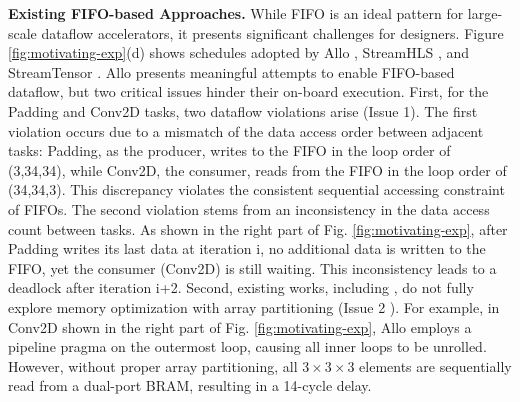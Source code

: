 \documentclass[conference]{IEEEtran}
\begin{document}
\textbf{Existing FIFO-based Approaches.} While FIFO is an ideal pattern for large-scale dataflow accelerators, it presents significant challenges for designers. Figure \ref{fig:motivating-exp}(d) shows schedules adopted by Allo \cite{chen2024allo}, StreamHLS \cite{streamhlsFPGA25}, and StreamTensor \cite{streamtensorMICRO25}.
Allo \cite{chen2024allo} presents meaningful attempts to enable FIFO-based dataflow, but two critical issues hinder their on-board execution. First, for the Padding and Conv2D tasks, two  dataflow violations arise (Issue 1). The first violation occurs due to a mismatch of the data access order between adjacent tasks: Padding, as the producer, writes to the FIFO in the loop order of (3,34,34), while Conv2D, the consumer, reads from the FIFO in the loop order of (34,34,3). This discrepancy violates the consistent sequential accessing constraint of FIFOs. The second violation stems from an inconsistency in the data access count between tasks. 
As shown in the right part of Fig. \ref{fig:motivating-exp}, after Padding writes its last data at iteration i, no additional data is written to the FIFO, yet the consumer (Conv2D) is still waiting. This inconsistency leads to a deadlock after iteration i+2. 
Second, existing works, including \cite{chen2024allo}, do not fully explore memory optimization with array partitioning (Issue 2 ). For example, in Conv2D shown in the right part of Fig. \ref{fig:motivating-exp}, Allo \cite{chen2024allo} employs a pipeline pragma on the outermost loop, causing all inner loops to be unrolled. However, without proper array partitioning, all $3\times3\times3$ elements are sequentially read from a dual-port BRAM, resulting in a 14-cycle delay. 
\end{document}
